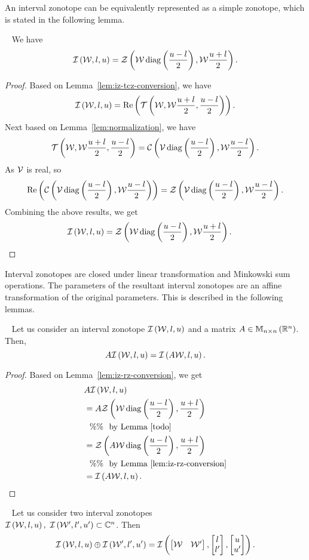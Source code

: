 %
An interval zonotope can be equivalently represented as a simple
zonotope, which is stated in the following lemma.
%
\begin{lemma}~\label{lem:iz-rz-conversion}
We have
%
\[
\mathit{\operatorname{\mathcal{I}}}\left(\mathcal{W},l,u\right)=\mathit{\mathcal{Z}}\left(\mathcal{W}\operatorname{diag}\left(\frac{u-l}{2}\right),\mathcal{W}\frac{u+l}{2}\right).
\]
%
\end{lemma}
%
\begin{proof}
Based on Lemma~\ref{lem:iz-tcz-conversion}, we have 
%
\[
\mathit{\operatorname{\mathcal{I}}}\left(\mathcal{W},l,u\right)=\operatorname{Re}\left(\mathit{\operatorname{\mathcal{T}}}\left(\mathcal{W},\mathcal{W}\frac{u+l}{2},\frac{u-l}{2}\right)\right).
\]
%
Next based on Lemma~\ref{lem:normalization}, we have 
%
\[
\mathit{\operatorname{\mathcal{T}}}\left(\mathcal{W},\mathcal{W}\frac{u+l}{2},\frac{u-l}{2}\right)=\mathit{\mathcal{C}}\left(\mathcal{V}\operatorname{diag}\left(\frac{u-l}{2}\right),\mathcal{W}\frac{u-l}{2}\right).
\]
%
As $\mathcal{V}$ is real, so
%
\[
\operatorname{Re}\left(\mathit{\mathcal{C}}\left(\mathcal{V}\operatorname{diag}\left(\frac{u-l}{2}\right),\mathcal{W}\frac{u-l}{2}\right)\right)=\mathit{\mathcal{Z}}\left(\mathcal{V}\operatorname{diag}\left(\frac{u-l}{2}\right),\mathcal{W}\frac{u-l}{2}\right).
\]
%
Combining the above results, we get
\[
\mathit{\operatorname{\mathcal{I}}}\left(\mathcal{W},l,u\right)=\mathit{\mathcal{Z}}\left(\mathcal{W}\operatorname{diag}\left(\frac{u-l}{2}\right),\mathcal{W}\frac{u+l}{2}\right).~~~~\qedhere
\]
%
\end{proof}
%
Interval zonotopes are closed under linear transformation and
Minkowski sum operations.  The parameters of the resultant interval
zonotopes are an affine transformation of the original parameters.
This is described in the following lemmas.
%
\begin{lemma}~\label{lem:iz-lin-transform}
Let us consider an interval zonotope $\mathit{\operatorname{\mathcal{I}}}\left(\mathcal{W},l,u\right)$ and a
matrix $A\in\mathbb{M}_{n\times n}\left(\mathbb{R}^n\right)$.  Then,
%
\[
A\mathit{\operatorname{\mathcal{I}}}\left(\mathcal{W},l,u\right)=\mathit{\operatorname{\mathcal{I}}}\left(A\mathcal{W},l,u\right).
\]
%
\end{lemma}
%
\begin{proof}
Based on Lemma~\ref{lem:iz-rz-conversion}, we get
%
\begin{align*}
&  A\mathit{\operatorname{\mathcal{I}}}\left(\mathcal{W},l,u\right)\\
  & =
  A\mathit{\mathcal{Z}}\left(\mathcal{W}\operatorname{diag}\left(\frac{u-l}{2}\right),\frac{u+l}{2}\right)\\
  & ~~\%\%~~\text{by Lemma~\ref{todo}}\\
  & = \mathit{\mathcal{Z}}\left(A\mathcal{W}\operatorname{diag}\left(\frac{u-l}{2}\right),\frac{u+l}{2}\right)\\
  & ~~\%\%~~\text{by Lemma~\ref{lem:iz-rz-conversion}}\\
  & = \mathit{\operatorname{\mathcal{I}}}\left(A\mathcal{W},l,u\right).~~~~~\qedhere
\end{align*}
%
\end{proof}
%
\begin{lemma}~\label{lem:iz-min-sum}
  Let us consider two interval zonotopes\\
  $\mathit{\operatorname{\mathcal{I}}}\left(\mathcal{W},l,u\right),~\mathit{\operatorname{\mathcal{I}}}\left(\mathcal{W}^\prime,l^\prime,u^\prime\right)\subset\mathbb{C}^n$.
  Then 
%
\[
\mathit{\operatorname{\mathcal{I}}}\left(\mathcal{W},l,u\right)\oplus \mathit{\operatorname{\mathcal{I}}}\left(\mathcal{W}^\prime,l^\prime,u^\prime\right)
= \mathit{\operatorname{\mathcal{I}}}\left(\left[\begin{matrix}\mathcal{W} &
    \mathcal{W}^\prime\end{matrix}\right],\left[\begin{matrix}l\\l^\prime\end{matrix}\right],\left[\begin{matrix}u\\u^\prime\end{matrix}\right]\right). 
\]
%
\end{lemma}
